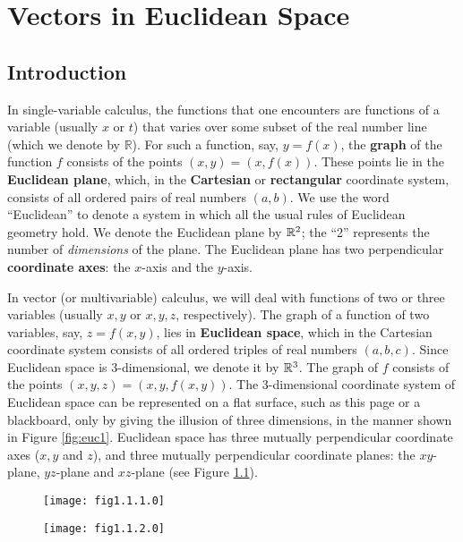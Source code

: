 \chapter{Vectors in Euclidean Space}
\section{Introduction}
In single-variable calculus, the functions that one encounters are functions of a variable (usually $x$ or $t$) 
that varies over some subset of the real number line (which we denote by $\mathbb{R}$).  For such a function, say,
$y = f(x)$, the \textbf{graph} of the function $f$ consists of the points $(x, y) = (x, f(x))$.  These points lie in
the \textbf{Euclidean plane}, which, in the \textbf{Cartesian} or
\textbf{rectangular} coordinate system, consists
of all ordered pairs of real numbers $(a, b)$.  We use the word ``Euclidean'' to denote a system in which all the
usual rules of Euclidean geometry hold.  We denote the Euclidean plane by $\mathbb{R}^{2}$;
the ``2'' represents
the number of \emph{dimensions} of the plane.  The Euclidean plane has two perpendicular
\textbf{coordinate axes}: the $x$-axis and the $y$-axis.

In vector (or multivariable) calculus, we will deal with functions of two or three variables (usually $x, y$ or
$x, y, z$, respectively).  
The graph of a function of two variables, say, $z = f(x,y)$, lies in \textbf{Euclidean space}, which in the Cartesian coordinate system consists of all ordered
triples of real numbers $(a, b, c)$.  Since Euclidean space is 3-dimensional, we denote it by
$\mathbb{R}^{3}$.  The graph of $f$ consists
of the points $(x, y, z) = (x, y, f(x, y))$.  The 3-dimensional coordinate system of Euclidean space can be
represented on a flat surface, such as this page or a blackboard, only by giving the illusion of three
dimensions, in the manner shown in Figure \ref{fig:euc1}.  Euclidean space has three mutually perpendicular
coordinate axes ($x, y$ and $z$), and three mutually perpendicular coordinate planes:
the $xy$-plane, $yz$-plane and $xz$-plane (see Figure \ref{fig:euc2}).
\newline
\begin{figure}[h]
\begin{minipage}[t]{7.5cm}
 \begin{center}
  \texttt{[image: fig1.1.1.0]}
 \end{center}
 \caption[]{}
 \label{fig:euc1}
\end{minipage}
\begin{minipage}[t]{7.5cm}
 \begin{center}
  \texttt{[image: fig1.1.2.0]}
 \end{center}
 \caption[]{}
 \label{fig:euc2}
\end{minipage}
\end{figure}

